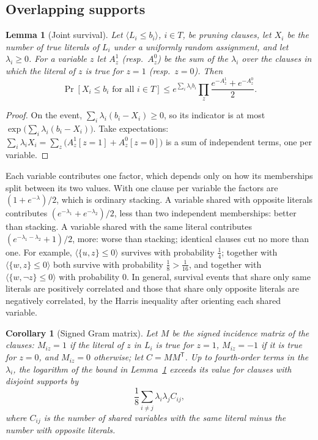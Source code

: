\documentclass[11pt,a4paper]{article}
\newtheorem{lemma}[theorem]{Lemma}
\newtheorem{corollary}[theorem]{Corollary}
\theoremstyle{remark}
\begin{document}
\subsection{Overlapping supports}

\begin{lemma}[Joint survival]\label{lem:joint}
Let $\langle L_i\le b_i\rangle$, $i\in T$, be pruning clauses, let $X_i$ be the
number of true literals of $L_i$ under a uniformly random assignment, and let
$\lambda_i\ge0$. For a variable $z$ let $A^1_z$ (resp.\ $A^0_z$) be the sum of
the $\lambda_i$ over the clauses in which the literal of $z$ is true for $z=1$
(resp.\ $z=0$). Then
\[
 \Pr[X_i\le b_i\text{ for all }i\in T]\le e^{\sum_i\lambda_ib_i}
 \prod_z\frac{e^{-A^1_z}+e^{-A^0_z}}{2}.
\]
\end{lemma}

\begin{proof}
On the event, $\sum_i\lambda_i(b_i-X_i)\ge0$, so its indicator is at most
$\exp\bigl(\sum_i\lambda_i(b_i-X_i)\bigr)$. Take expectations:
$\sum_i\lambda_iX_i=\sum_z\bigl(A^1_z[z=1]+A^0_z[z=0]\bigr)$ is a sum of
independent terms, one per variable.
\end{proof}

Each variable contributes one factor, which depends only on how its memberships
split between its two values. With one clause per variable the factors are
$(1+e^{-\lambda})/2$, which is ordinary stacking. A variable shared with
opposite literals contributes $(e^{-\lambda_1}+e^{-\lambda_2})/2$, less than
two independent memberships: better than stacking. A variable shared with the
same literal contributes $(e^{-\lambda_1-\lambda_2}+1)/2$, more: worse than
stacking; identical clauses cut no more than one. For example,
$\langle\{u,z\}\le0\rangle$ survives with probability $\frac14$; together with
$\langle\{w,z\}\le0\rangle$ both survive with probability $\frac18>\frac1{16}$,
and together with $\langle\{w,\neg z\}\le0\rangle$ with probability $0$. In
general, survival events that share only same literals are positively
correlated and those that share only opposite literals are negatively
correlated, by the Harris inequality after orienting each shared variable.

\begin{corollary}[Signed Gram matrix]\label{cor:gram}
Let $M$ be the signed incidence matrix of the clauses: $M_{iz}=1$ if the
literal of $z$ in $L_i$ is true for $z=1$, $M_{iz}=-1$ if it is true for $z=0$,
and $M_{iz}=0$ otherwise; let $C=MM^{\mathsf T}$. Up to fourth-order terms in
the $\lambda_i$, the logarithm of the bound in Lemma~\ref{lem:joint} exceeds its
value for clauses with disjoint supports by
\[
 \frac18\sum_{i\ne j}\lambda_i\lambda_jC_{ij},
\]
where $C_{ij}$ is the number of shared variables with the same literal minus
the number with opposite literals.
\end{corollary}
\end{document}
